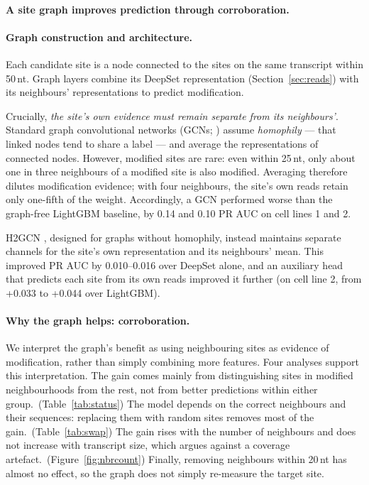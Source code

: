 \documentclass[11pt,a4paper]{article}
\begin{document}
\paragraph{A site graph improves prediction through corroboration.}


\paragraph{Graph construction and architecture.}
Each candidate site is a node connected to the sites on the same transcript within 50\,nt. Graph layers combine its DeepSet representation (Section~\ref{sec:reads}) with its neighbours' representations to predict modification.

Crucially, \emph{the site's own evidence must remain separate from its neighbours'}. Standard graph convolutional networks (GCNs; \citealp{kipf2017}) assume \emph{homophily} --- that linked nodes tend to share a label --- and average the representations of connected nodes. However, modified sites are rare: even within 25\,nt, only about one in three neighbours of a modified site is also modified. Averaging therefore dilutes modification evidence; with four neighbours, the site's own reads retain only one-fifth of the weight. Accordingly, a GCN performed worse than the graph-free LightGBM baseline, by 0.14 and 0.10 PR AUC on cell lines 1 and 2.

H2GCN \citep{zhu2020}, designed for graphs without homophily, instead maintains separate channels for the site's own representation and its neighbours' mean. This improved PR AUC by 0.010--0.016 over DeepSet alone, and an auxiliary head that predicts each site from its own reads improved it further (on cell line 2, from +0.033 to +0.044 over LightGBM).

\paragraph{Why the graph helps: corroboration.}
We interpret the graph's benefit as using neighbouring sites as evidence of modification, rather than simply combining more features. Four analyses support this interpretation. The gain comes mainly from distinguishing sites in modified neighbourhoods from the rest, not from better predictions within either group.~(Table~\ref{tab:status}) The model depends on the correct neighbours and their sequences: replacing them with random sites removes most of the gain.~(Table~\ref{tab:swap}) The gain rises with the number of neighbours and does not increase with transcript size, which argues against a coverage artefact.~(Figure~\ref{fig:nbrcount}) Finally, removing neighbours within 20\,nt has almost no effect, so the graph does not simply re-measure the target site.
\end{document}
